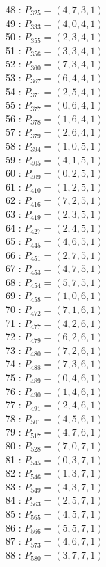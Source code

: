 \documentclass{article}
\begin{document}
{\begin{multicols}{3}
48 : $P_{325}=( 4, 7, 3, 1 )$\\
49 : $P_{333}=( 4, 0, 4, 1 )$\\
50 : $P_{355}=( 2, 3, 4, 1 )$\\
51 : $P_{356}=( 3, 3, 4, 1 )$\\
52 : $P_{360}=( 7, 3, 4, 1 )$\\
53 : $P_{367}=( 6, 4, 4, 1 )$\\
54 : $P_{371}=( 2, 5, 4, 1 )$\\
55 : $P_{377}=( 0, 6, 4, 1 )$\\
56 : $P_{378}=( 1, 6, 4, 1 )$\\
57 : $P_{379}=( 2, 6, 4, 1 )$\\
58 : $P_{394}=( 1, 0, 5, 1 )$\\
59 : $P_{405}=( 4, 1, 5, 1 )$\\
60 : $P_{409}=( 0, 2, 5, 1 )$\\
61 : $P_{410}=( 1, 2, 5, 1 )$\\
62 : $P_{416}=( 7, 2, 5, 1 )$\\
63 : $P_{419}=( 2, 3, 5, 1 )$\\
64 : $P_{427}=( 2, 4, 5, 1 )$\\
65 : $P_{445}=( 4, 6, 5, 1 )$\\
66 : $P_{451}=( 2, 7, 5, 1 )$\\
67 : $P_{453}=( 4, 7, 5, 1 )$\\
68 : $P_{454}=( 5, 7, 5, 1 )$\\
69 : $P_{458}=( 1, 0, 6, 1 )$\\
70 : $P_{472}=( 7, 1, 6, 1 )$\\
71 : $P_{477}=( 4, 2, 6, 1 )$\\
72 : $P_{479}=( 6, 2, 6, 1 )$\\
73 : $P_{480}=( 7, 2, 6, 1 )$\\
74 : $P_{488}=( 7, 3, 6, 1 )$\\
75 : $P_{489}=( 0, 4, 6, 1 )$\\
76 : $P_{490}=( 1, 4, 6, 1 )$\\
77 : $P_{491}=( 2, 4, 6, 1 )$\\
78 : $P_{501}=( 4, 5, 6, 1 )$\\
79 : $P_{517}=( 4, 7, 6, 1 )$\\
80 : $P_{528}=( 7, 0, 7, 1 )$\\
81 : $P_{545}=( 0, 3, 7, 1 )$\\
82 : $P_{546}=( 1, 3, 7, 1 )$\\
83 : $P_{549}=( 4, 3, 7, 1 )$\\
84 : $P_{563}=( 2, 5, 7, 1 )$\\
85 : $P_{565}=( 4, 5, 7, 1 )$\\
86 : $P_{566}=( 5, 5, 7, 1 )$\\
87 : $P_{573}=( 4, 6, 7, 1 )$\\
88 : $P_{580}=( 3, 7, 7, 1 )$\\
\end{multicols}


}
\end{document}
